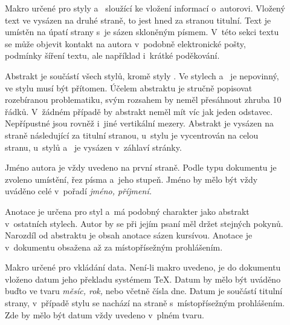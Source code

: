 \documentclass[12pt]{article}
\begin{document}
\begin{description}

\item[]
  Makro určené pro styly  a~ sloužící ke vložení
  informací o~autorovi. Vložený text ve vysázen na druhé straně, to jest hned
  za stranou titulní. Text je umístěn na úpatí strany s~je sázen skloněným
  písmem. V~této sekci textu se může objevit kontakt na autora v~podobně
  elektronické pošty, podmínky šíření textu, ale například i~krátké poděkování.

\item[]
  Abstrakt je součástí všech stylů, kromě styly . Ve stylech
   a~ je nepovinný, ve stylu  musí
  být přítomen. Účelem abstraktu je stručně popisovat rozebíranou 
  problematiku, svým rozsahem by neměl přesáhnout zhruba 10 řádků. V~žádném
  případě by abstrakt neměl mít víc jak jeden odstavec. Nepřípustné jsou
  rovněž i~jiné vertikální mezery. Abstrakt je vysázen na straně následující
  za titulní stranou, u~stylu  je vycentrován na celou stranu,
  u~stylů  a~ je vysázen v~záhlaví stránky.

\item[]
  Jméno autora je vždy uvedeno na první straně. Podle typu dokumentu je 
  zvoleno umístění, řez písma a~jeho stupeň. Jméno by mělo být vždy uváděno
  celé v~pořadí \emph{jméno, příjmení.}

\item[]
  Anotace je určena pro styl  a~má podobný charakter jako 
  abstrakt v~ostatních stylech. Autor by se při jejím psaní měl držet stejných
  pokynů. Narozdíl od abstraktu je obsah anotace sázen kursívou. 
  Anotace je v~dokumentu obsažena až za místopřísežným prohlášením.


\item[]
  Makro určené pro vkládání data. Není-li makro uvedeno, 
  je do dokumentu vloženo datum jeho překladu systémem \TeX.
  Datum by mělo být uváděno buďto ve tvaru \emph{měsíc, rok,} nebo včetně 
  čísla dne. Datum je součástí titulní strany, v~případě stylu 
  se nachází na straně s~místopřísežným prohlášením. Zde by mělo být datum
  vždy uvedeno v~plném tvaru.


\end{description}
\end{document}
